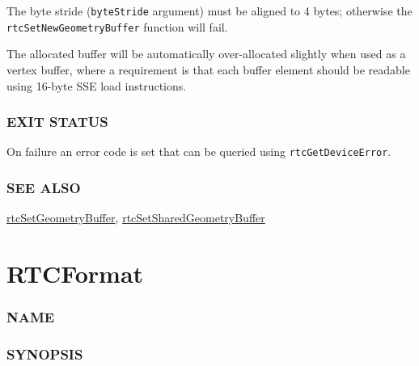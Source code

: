 The byte stride (\texttt{byteStride} argument) must be aligned to 4
bytes; otherwise the \texttt{rtcSetNewGeometryBuffer} function will
fail.

The allocated buffer will be automatically over-allocated slightly when
used as a vertex buffer, where a requirement is that each buffer element
should be readable using 16-byte SSE load instructions.

\subsubsection{EXIT STATUS}\label{exit-status}

On failure an error code is set that can be queried using
\texttt{rtcGetDeviceError}.

\subsubsection{SEE ALSO}\label{see-also}

\hyperref[rtcsetgeometrybuffer]{rtcSetGeometryBuffer},
\hyperref[rtcsetsharedgeometrybuffer]{rtcSetSharedGeometryBuffer}

\pagebreak

\section{RTCFormat}\label{rtcformat}

\subsubsection{NAME}\label{name}

\begin{Shaded}
\begin{Highlighting}[]
\OperatorTok{{-}}
\end{Highlighting}
\end{Shaded}

\subsubsection{SYNOPSIS}\label{synopsis}

